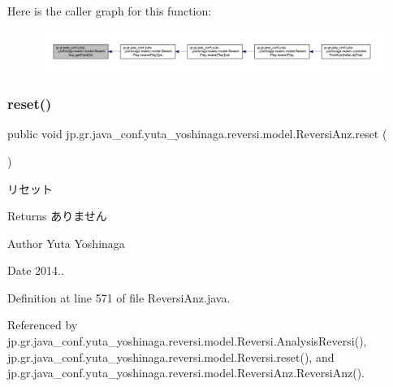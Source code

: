 Here is the caller graph for this function\+:
\nopagebreak
\begin{figure}[H]
\begin{center}
\leavevmode
\includegraphics[width=350pt]{classjp_1_1gr_1_1java__conf_1_1yuta__yoshinaga_1_1reversi_1_1model_1_1_reversi_anz_ad6a22ffbec6cd298d3943c437350e54c_icgraph}
\end{center}
\end{figure}
\mbox{\label{classjp_1_1gr_1_1java__conf_1_1yuta__yoshinaga_1_1reversi_1_1model_1_1_reversi_anz_ab87a68776fedd66e0fa8bed2c24d461b}} 
\subsubsection{\texorpdfstring{reset()}{reset()}}
{\footnotesize\ttfamily public void jp.\+gr.\+java\+\_\+conf.\+yuta\+\_\+yoshinaga.\+reversi.\+model.\+Reversi\+Anz.\+reset (\begin{DoxyParamCaption}{ }\end{DoxyParamCaption})}



リセット 

\begin{DoxyReturn}{Returns}
ありません 
\end{DoxyReturn}
\begin{DoxyAuthor}{Author}
Yuta Yoshinaga 
\end{DoxyAuthor}
\begin{DoxyDate}{Date}
2014.. 
\end{DoxyDate}


Definition at line 571 of file Reversi\+Anz.\+java.



Referenced by jp.\+gr.\+java\+\_\+conf.\+yuta\+\_\+yoshinaga.\+reversi.\+model.\+Reversi.\+Analysis\+Reversi(), jp.\+gr.\+java\+\_\+conf.\+yuta\+\_\+yoshinaga.\+reversi.\+model.\+Reversi.\+reset(), and jp.\+gr.\+java\+\_\+conf.\+yuta\+\_\+yoshinaga.\+reversi.\+model.\+Reversi\+Anz.\+Reversi\+Anz().

